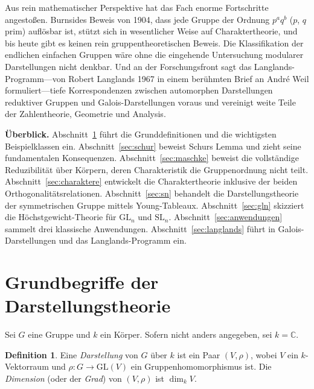\documentclass[12pt,a4paper]{amsart}
\theoremstyle{definition}
\newtheorem{definition}[theorem]{Definition}
\begin{document}
Aus rein mathematischer Perspektive hat das Fach enorme Fortschritte angestoßen.
Burnsides Beweis von 1904, dass jede Gruppe der Ordnung $p^a q^b$ ($p$, $q$
prim) auflösbar ist, stützt sich in wesentlicher Weise auf Charaktertheorie,
und bis heute gibt es keinen rein gruppentheoretischen Beweis.  Die Klassifikation
der endlichen einfachen Gruppen wäre ohne die eingehende Untersuchung modularer
Darstellungen nicht denkbar.  Und an der Forschungsfront sagt das
Langlands-Programm---von Robert Langlands 1967 in einem berühmten Brief an
André Weil formuliert---tiefe Korrespondenzen zwischen automorphen Darstellungen
reduktiver Gruppen und Galois-Darstellungen voraus und vereinigt weite Teile der
Zahlentheorie, Geometrie und Analysis.

\medskip

\noindent\textbf{Überblick.} Abschnitt~\ref{sec:grund} führt die
Grunddefinitionen und die wichtigsten Beispielklassen ein.
Abschnitt~\ref{sec:schur} beweist Schurs Lemma und zieht seine fundamentalen
Konsequenzen.  Abschnitt~\ref{sec:maschke} beweist die vollständige
Reduzibilität über Körpern, deren Charakteristik die Gruppenordnung nicht
teilt.  Abschnitt~\ref{sec:charaktere} entwickelt die Charaktertheorie
inklusive der beiden Orthogonalitätsrelationen.  Abschnitt~\ref{sec:sn}
behandelt die Darstellungstheorie der symmetrischen Gruppe mittels
Young-Tableaux.  Abschnitt~\ref{sec:gln} skizziert die Höchstgewicht-Theorie
für $\mathrm{GL}_n$ und $\mathrm{SL}_n$.  Abschnitt~\ref{sec:anwendungen}
sammelt drei klassische Anwendungen.  Abschnitt~\ref{sec:langlands} führt in
Galois-Darstellungen und das Langlands-Programm ein.

\section{Grundbegriffe der Darstellungstheorie}
\label{sec:grund}

Sei $G$ eine Gruppe und $k$ ein Körper.  Sofern nicht anders angegeben,
sei $k = \mathbb{C}$.

\begin{definition}
Eine \emph{Darstellung} von $G$ über $k$ ist ein Paar $(V,\rho)$, wobei $V$ ein
$k$-Vektorraum und $\rho \colon G \to \mathrm{GL}(V)$ ein Gruppenhomomorphismus
ist.  Die \emph{Dimension} (oder der \emph{Grad}) von $(V,\rho)$ ist
$\dim_k V$.
\end{definition}
\end{document}
